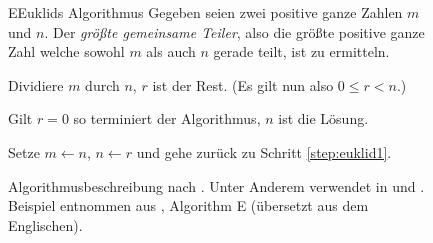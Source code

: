 \begin{figure}[hbt]
    \begin{algo}{E}{Euklids Algorithmus}
        Gegeben seien zwei positive ganze Zahlen $m$ und $n$. Der \emph{größte gemeinsame Teiler}, also die größte positive ganze Zahl welche sowohl $m$ als auch $n$ gerade teilt, ist zu ermitteln.
    
        \begin{algosteps}
             Dividiere $m$ durch $n$, $r$ ist der Rest. (Es gilt nun also $0 \leq r < n$.)\label{step:euklid1}
    
             Gilt $r = 0$ so terminiert der Algorithmus, $n$ ist die Lösung.\label{step:euklid2}
            
            \algostep[Verringere.] Setze $m \leftarrow n$, $n \leftarrow r$ und gehe zurück zu Schritt \ref{step:euklid1}\label{step:euklid3}.
        \end{algosteps}
    \end{algo}
    \caption{Algorithmusbeschreibung nach \citeauthor{taocp1}. Unter Anderem verwendet in \cite{taocp1} und \cite{taocp3}. Beispiel entnommen aus \cite[2]{taocp1}, Algorithm E (übersetzt aus dem Englischen).}
    \label{fig:knuth-algorithm-specification}
\end{figure}
